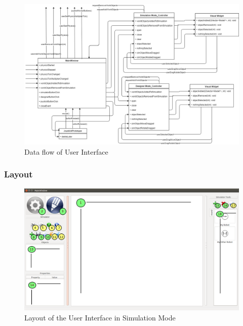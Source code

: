 \begin{figure}
 	\begin{center}
 	\includegraphics[width=\textwidth]{./images_design/uml/DataFlow_UI}
 	\caption{Data flow of User Interface\label{uml:dataflow_ui}}
 	\end{center}
 \end{figure} 
 
 \subsubsection*{Layout}
  \begin{figure}[h!]
 	\begin{center}
 	\includegraphics[width=\textwidth]{./images_design/simulator_with_my_robots_nums.png}
 	\caption{Layout of the User Interface in Simulation Mode\label{fig:sim_overview}}
 	\end{center}
 \end{figure}
 
